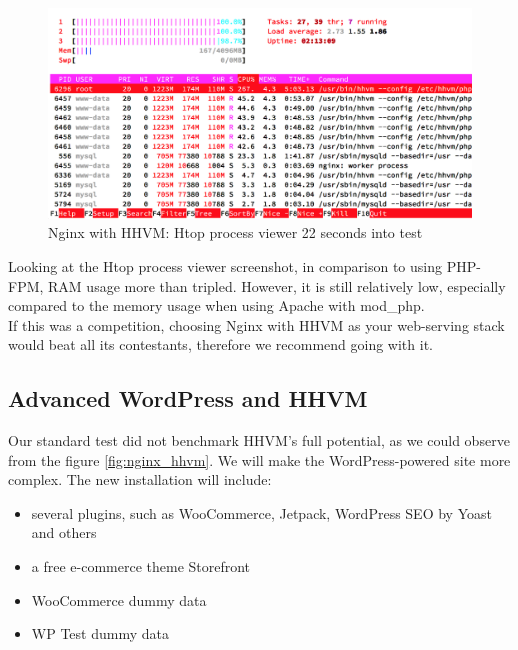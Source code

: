 \begin{figure}[H]
\begin{center}
\includegraphics[scale=0.5]{figures/Nginx_HHVM_24s.png}
\caption{Nginx with HHVM: Htop process viewer 22 seconds into test}
\label{fig:nginx_hhvm_24s}
\end{center}
\end{figure}

Looking at the Htop process viewer screenshot, in comparison to using PHP-FPM, RAM usage more than tripled. However, it is still relatively low, especially compared to the memory usage when using Apache with mod\_php. \\

If this was a competition, choosing Nginx with HHVM as your web-serving stack would beat all its contestants, therefore we recommend going with it.

\subsection{Advanced WordPress and HHVM} \label{advanced-wordpress-hhvm}

Our standard test did not benchmark HHVM's full potential, as we could observe from the figure \ref{fig:nginx_hhvm}. We will make the WordPress-powered site more complex. The new installation will include:

\begin{itemize}
	\item several plugins, such as WooCommerce, Jetpack, WordPress SEO by Yoast and others \cite{WP_Ansible:group_vars}
	\item a free e-commerce theme Storefront \cite{WP:Storefront}
	\item WooCommerce dummy data
	\item WP Test dummy data \cite{WP:WP_Test-dummy-data}
\end{itemize}

